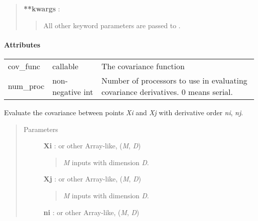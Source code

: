 \documentclass[letterpaper,10pt,english]{sphinxmanual}
\begin{document}
\begin{fulllineitems}
\begin{quote}
\begin{description}
\textbf{**kwargs} :
\begin{quote}

All other keyword parameters are passed to {\hyperref[gptools.kernel:gptools.kernel.core.Kernel]{}}.
\end{quote}

\end{description}\end{quote}
\paragraph{Attributes}

\begin{tabulary}{\linewidth}{|L|L|L|}
\hline

cov\_func
 & 
callable
 & 
The covariance function
\\

num\_proc
 & 
non-negative int
 & 
Number of processors to use in evaluating covariance derivatives. 0 means serial.
\\
\hline\end{tabulary}


\begin{fulllineitems}
\label{gptools.kernel:gptools.kernel.core.ArbitraryKernel.__call__}
Evaluate the covariance between points \emph{Xi} and \emph{Xj} with derivative order \emph{ni}, \emph{nj}.
\begin{quote}\begin{description}
\item[{Parameters}] \leavevmode
\textbf{Xi} :  or other Array-like, (\emph{M}, \emph{D})
\begin{quote}

\emph{M} inputs with dimension \emph{D}.
\end{quote}

\textbf{Xj} :  or other Array-like, (\emph{M}, \emph{D})
\begin{quote}

\emph{M} inputs with dimension \emph{D}.
\end{quote}

\textbf{ni} :  or other Array-like, (\emph{M}, \emph{D})
\begin{quote}


\end{quote}
\end{description}
\end{quote}
\end{fulllineitems}
\end{fulllineitems}
\end{document}
